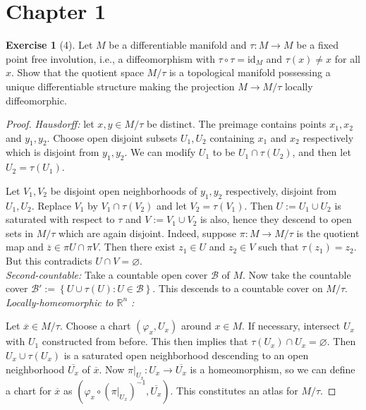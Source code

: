 \documentclass[reqno]{amsart}
\theoremstyle{definition}
\newtheorem{exercise}[theorem]{Exercise}
\theoremstyle{remark}
\newcommand{\id}{{\mathrm{id}}}
\begin{document}
\section*{Chapter 1}

\begin{exercise}[4]
    Let $M$ be a differentiable manifold and
    $\tau \colon M \to M$ be a fixed point free involution, i.e.,
    a diffeomorphism with $\tau \circ \tau = \id_M$ and
    $\tau(x) \neq x$ for all $x$.
    Show that the quotient space $M / \tau$ is 
    a topological manifold possessing a unique differentiable
    structure making the projection
    $M \to M/\tau $ locally diffeomorphic.
\end{exercise}

\begin{proof}
    \textit{Hausdorff:} let $x,y \in M / \tau$ be distinct.
    The preimage contains points $x_1,x_2$ and
    $y_1,y_2$. Choose open disjoint subsets $U_1, U_2$ containing
    $x_1$ and $x_2$ respectively which is disjoint from
    $y_1,y_2$. We can modify 
    $U_1$ to be $U_1 \cap \tau (U_2)$, and
    then let $U_2 = \tau (U_1)$. 

    Let $V_1, V_2$ be disjoint open neighborhoods of
    $y_1,y_2$ respectively, disjoint from $U_1,U_2$.
    Replace $V_1$ by $V_1 \cap \tau (V_2)$ and
    let $V_2 = \tau(V_1)$. Then
    $U :=U_1 \cup U_2$ is saturated with respect to
    $\tau$ and $V := V_1 \cup  V_2$ is also, hence
    they descend to open sets
    in $M / \tau$ which are again disjoint. 
    Indeed, suppose $\pi \colon M \to M/\tau$ is the quotient map
    and $\overline{z} \in \pi U \cap \pi V$. Then
    there exist  $z_1 \in U$ and $z_2 \in V$ such that
    $\tau \left( z_1 \right) = z_2$. But this contradicts
    $U \cap V = \varnothing$.\\

    \textit{Second-countable:} Take a countable
    open cover $\mathcal{B}$ of $M$. Now take the countable
    cover $\mathcal{B}' :=
    \left\{ U \cup  \tau (U) \colon U \in \mathcal{B} \right\} $.
    This descends to a countable cover on $M / \tau$.\\

    \textit{Locally-homeomorphic to $\mathbb{R}^{n}$ :}

    Let $\overline{x} \in M / \tau$. Choose
    a chart $\left( \varphi_x, U_x \right) $ around
    $x \in M$. If necessary, intersect
    $U_x$ with $U_1$ constructed from before. This
    then implies that $\tau(U_x) \cap U_x = \varnothing$.
    Then $U_x \cup \tau \left( U_x \right) $ is a 
    saturated open neighborhood descending to an
    open neighborhood $\overline{U_x}$ of $\overline{x}$.
    Now $\pi|_{U_x} \colon U_x \to \overline{U_x}$ is a
    homeomorphism, so we can define a chart for $\overline{x}$ 
    as $\left( \varphi_x \circ \left( \pi|_{U_x} \right)^{-1},
    \overline{U_x} \right) $. This constitutes an
    atlas for $M / \tau$.


\end{proof}
\end{document}
